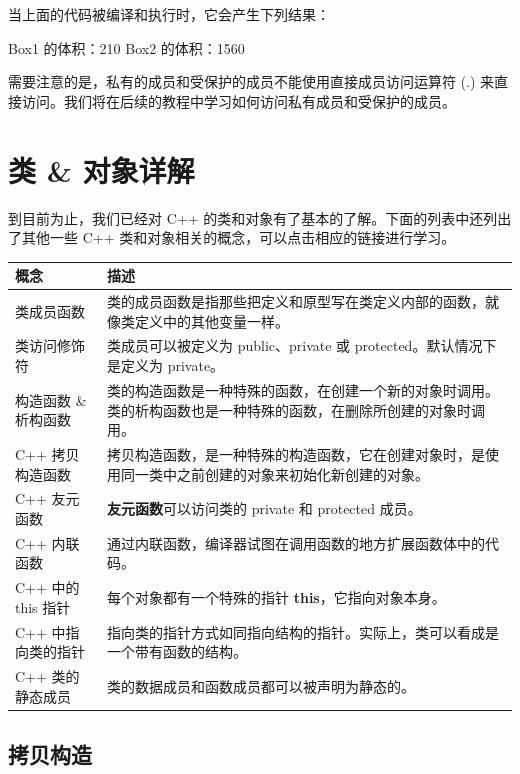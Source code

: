\documentclass[
]{article}
\newenvironment{Shaded}{}{}
\newcommand{\DecValTok}[1]{\textcolor[rgb]{0.25,0.63,0.44}{#1}}
\newcommand{\NormalTok}[1]{#1}
\begin{document}
当上面的代码被编译和执行时，它会产生下列结果：

\begin{Shaded}
\begin{Highlighting}[]
\NormalTok{Box1 的体积：}\DecValTok{210}
\NormalTok{Box2 的体积：}\DecValTok{1560}
\end{Highlighting}
\end{Shaded}

需要注意的是，私有的成员和受保护的成员不能使用直接成员访问运算符 (.)
来直接访问。我们将在后续的教程中学习如何访问私有成员和受保护的成员。

\hypertarget{ux7c7b-ux5bf9ux8c61ux8be6ux89e3}{%
\section{类 \& 对象详解}\label{ux7c7b-ux5bf9ux8c61ux8be6ux89e3}}

到目前为止，我们已经对 C++
的类和对象有了基本的了解。下面的列表中还列出了其他一些 C++
类和对象相关的概念，可以点击相应的链接进行学习。

\begin{longtable}[]{@{}ll@{}}
\toprule
概念 & 描述 \\
\midrule
\endhead
类成员函数 &
类的成员函数是指那些把定义和原型写在类定义内部的函数，就像类定义中的其他变量一样。 \\
类访问修饰符 & 类成员可以被定义为 public、private 或
protected。默认情况下是定义为 private。 \\
构造函数 \& 析构函数 &
类的构造函数是一种特殊的函数，在创建一个新的对象时调用。类的析构函数也是一种特殊的函数，在删除所创建的对象时调用。 \\
C++ 拷贝构造函数 &
拷贝构造函数，是一种特殊的构造函数，它在创建对象时，是使用同一类中之前创建的对象来初始化新创建的对象。 \\
C++ 友元函数 & \textbf{友元函数}可以访问类的 private 和 protected
成员。 \\
C++ 内联函数 &
通过内联函数，编译器试图在调用函数的地方扩展函数体中的代码。 \\
C++ 中的 this 指针 & 每个对象都有一个特殊的指针
\textbf{this}，它指向对象本身。 \\
C++ 中指向类的指针 &
指向类的指针方式如同指向结构的指针。实际上，类可以看成是一个带有函数的结构。 \\
C++ 类的静态成员 & 类的数据成员和函数成员都可以被声明为静态的。 \\
\bottomrule
\end{longtable}

\hypertarget{ux62f7ux8d1dux6784ux9020}{%
\subsection{拷贝构造}\label{ux62f7ux8d1dux6784ux9020}}
\end{document}
